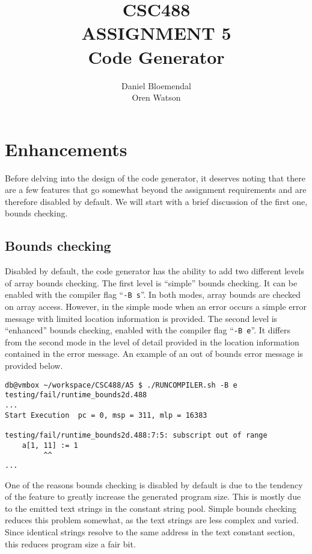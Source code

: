 \documentclass[oneside]{amsart}
\theoremstyle{definition}
\theoremstyle{remark}
\numberwithin{equation}{section}
\begin{document}
\title[CSC488 A5]{CSC488\\ASSIGNMENT 5\\Code Generator}
\author{Daniel Bloemendal \\ Oren Watson}

\begin{titlepage}
\maketitle
\thispagestyle{empty}
\tableofcontents
\end{titlepage}

\section{Enhancements}
Before delving into the design of the code generator, it deserves noting that there are a few
features that go somewhat beyond the assignment requirements and are therefore disabled by default.
We will start with a brief discussion of the first one, bounds checking.

\subsection{Bounds checking}
Disabled by default, the code generator has the ability to add two different levels of array bounds
checking. The first level is ``simple'' bounds checking. It can be enabled with the compiler flag
``\texttt{-B s}''. In both modes, array bounds are checked on array access. However, in the simple
mode when an error occurs a simple error message with limited location information is provided. The
second level is ``enhanced'' bounds checking, enabled with the compiler flag ``\texttt{-B e}''. It
differs from the second mode in the level of detail provided in the location information contained
in the error message. An example of an out of bounds error message is provided below.
\begin{lstlisting}[caption=Out of bounds error, basicstyle=\fontsize{7}{10}\selectfont\ttfamily]
db@vmbox ~/workspace/CSC488/A5 $ ./RUNCOMPILER.sh -B e testing/fail/runtime_bounds2d.488
...
Start Execution  pc = 0, msp = 311, mlp = 16383

testing/fail/runtime_bounds2d.488:7:5: subscript out of range
    a[1, 11] := 1
         ^^
...
\end{lstlisting}
One of the reasons bounds checking is disabled by default is due to the tendency of the feature to
greatly increase the generated program size. This is mostly due to the emitted text strings in the
constant string pool. Simple bounds checking reduces this problem somewhat, as the text strings are
less complex and varied. Since identical strings resolve to the same address in the text constant
section, this reduces program size a fair bit.
\end{document}
